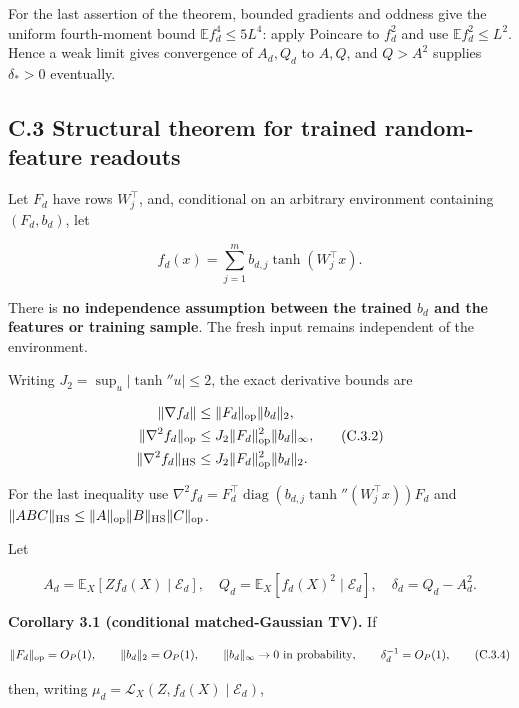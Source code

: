 \documentclass[
  11pt,
  a4paper,
]{article}
\begin{document}
For the last assertion of the theorem, bounded gradients and oddness
give the uniform fourth-moment bound \(\mathbb E f_d^4\le5L^4\): apply
Poincare to \(f_d^2\) and use \(\mathbb E f_d^2\le L^2\). Hence a weak
limit gives convergence of \(A_d,Q_d\) to \(A,Q\), and \(Q>A^2\)
supplies \(\delta_*>0\) eventually.

\hypertarget{c.3-structural-theorem-for-trained-random-feature-readouts}{%
\subsection{C.3 Structural theorem for trained random-feature
readouts}\label{c.3-structural-theorem-for-trained-random-feature-readouts}}

Let \(F_d\) have rows \(W_j^\top\), and, conditional on an arbitrary
environment containing \((F_d,b_d)\), let

\[
f_d(x)=\sum_{j=1}^m b_{d,j}\tanh(W_j^\top x).
\tag{C.3.1}
\]

There is \textbf{no independence assumption between the trained \(b_d\)
and the features or training sample}. The fresh input remains
independent of the environment.

Writing \(J_2=\sup_u|\tanh''u|\le2\), the exact derivative bounds are

\[
\begin{aligned}
\|\nabla f_d\|
 &\le\|F_d\|_{\rm op}\|b_d\|_2,\\
\|\nabla^2f_d\|_{\rm op}
 &\le J_2\|F_d\|_{\rm op}^2\|b_d\|_\infty,\\
\|\nabla^2f_d\|_{\rm HS}
 &\le J_2\|F_d\|_{\rm op}^2\|b_d\|_2.
\end{aligned}
\tag{C.3.2}
\]

For the last inequality use
\(\nabla^2 f_d=F_d^\top\operatorname{diag} (b_{d,j}\tanh''(W_j^\top x))F_d\)
and \(\|ABC\|_{\rm HS}\le\|A\|_{\rm op}\|B\|_{\rm HS}\|C\|_{\rm op}\).

Let

\[
A_d=\mathbb E_X[Zf_d(X)\mid\mathcal E_d],\quad
Q_d=\mathbb E_X[f_d(X)^2\mid\mathcal E_d],\quad
\delta_d=Q_d-A_d^2.
\tag{C.3.3}
\]

\textbf{Corollary 3.1 (conditional matched-Gaussian TV).} If

\[
\|F_d\|_{\rm op}=O_P(1),\qquad
\|b_d\|_2=O_P(1),\qquad
\|b_d\|_\infty\to0\text{ in probability},\qquad
\delta_d^{-1}=O_P(1),
\tag{C.3.4}
\]

then, writing \(\mu_d=\mathcal L_X(Z,f_d(X)\mid\mathcal E_d)\),
\end{document}
